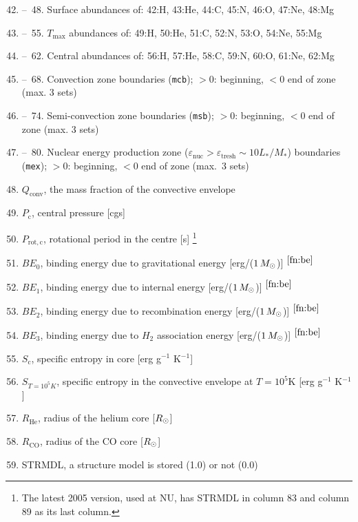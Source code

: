 \begin{enumerate}
\setcounter{enumi}{41} 
\item-- \,48. Surface abundances of: 42:H, 43:He, 44:C, 45:N, 46:O, 47:Ne, 48:Mg
\setcounter{enumi}{48} 
\item-- \,55. $T_\mathrm{max}$ abundances of: 49:H, 50:He, 51:C, 52:N, 53:O, 54:Ne, 55:Mg
\setcounter{enumi}{55} 
\item-- \,62. Central abundances of: 56:H, 57:He, 58:C, 59:N, 60:O, 61:Ne, 62:Mg
\setcounter{enumi}{62} 
\item-- \,68. Convection zone boundaries (\texttt{mcb}); $> 0$: beginning, $< 0$ end of zone (max. 3 sets)
\setcounter{enumi}{68} 
\item-- \,74. Semi-convection zone boundaries (\texttt{msb}); $> 0$: beginning, $< 0$ end of zone (max. 3 sets)
\setcounter{enumi}{74} 
\item-- \,80. Nuclear energy production zone ($\varepsilon_\mathrm{nuc} > \varepsilon_\mathrm{tresh} \sim 10 L_*/M_* $) boundaries (\texttt{mex}); $> 0$: beginning, $< 0$ end of zone (max.\ 3 sets)
\setcounter{enumi}{80} 

\item $Q_\mathrm{conv}$, the mass fraction of the convective envelope

\item $P_\mathrm{c}$, central pressure [cgs]

\item $P_\mathrm{rot,c}$, rotational period in the centre [s] 
\footnote{The latest 2005 version, used at NU, has STRMDL in column 83 and column 89 as its last column.}

\item $B\!E_0$, binding energy due to gravitational energy [erg/($1\,M_\odot$)] $^{\ref{fn:be}}$
\item $B\!E_1$, binding energy due to internal energy [erg/($1\,M_\odot$)] $^{\ref{fn:be}}$
\item $B\!E_2$, binding energy due to recombination energy [erg/($1\,M_\odot$)] $^{\ref{fn:be}}$
\item $B\!E_3$, binding energy due to $H_2$ association energy [erg/($1\,M_\odot$)] $^{\ref{fn:be}}$

\item $S_\mathrm{c}$, specific entropy in core [erg g$^{-1}$ K$^{-1}$]
\item $S_{T=10^5K}$, specific entropy in the convective envelope at $T=10^5$K [erg g$^{-1}$ K$^{-1}$]

\item $R_\mathrm{He}$, radius of the helium core [$R_\odot$]
\item $R_\mathrm{CO}$, radius of the CO core [$R_\odot$]

\item STRMDL, a structure model is stored (1.0) or not (0.0)

\end{enumerate}




